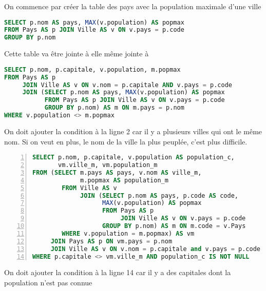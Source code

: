 \begin{Answer}
On commence par créer la table des pays avec la population maximale d'une ville
\begin{lstlisting}[language=SQL]
SELECT p.nom AS pays, MAX(v.population) AS popmax
FROM Pays AS p JOIN Ville AS v ON v.pays = p.code
GROUP BY p.nom
\end{lstlisting}

Cette table va être jointe à  elle même jointe à 
\begin{lstlisting}[language=SQL]
SELECT p.nom, p.capitale, v.population, m.popmax
FROM Pays AS p 
     JOIN Ville AS v ON v.nom = p.capitale AND v.pays = p.code
     JOIN (SELECT p.nom AS pays, MAX(v.population) AS popmax
           FROM Pays AS p JOIN Ville AS v ON v.pays = p.code
           GROUP BY p.nom) AS m ON m.pays = p.nom
WHERE v.population <> m.popmax
\end{lstlisting}
On doit ajouter la condition  à la ligne 2 car il y a plusieurs villes qui ont le même nom.
\newpage
Si on veut en plus, le nom de la ville la plus peuplée, c'est plus difficile.
\begin{lstlisting}[language=SQL,numbers=left]
SELECT p.nom, p.capitale, v.population AS population_c, 
       vm.ville_m, vm.population_m
FROM (SELECT m.pays AS pays, v.nom AS ville_m, 
             m.popmax AS population_m
        FROM Ville AS v 
             JOIN (SELECT p.nom AS pays, p.code AS code, 
                   MAX(v.population) AS popmax
                   FROM Pays AS p 
                        JOIN Ville AS v ON v.pays = p.code
                   GROUP BY p.nom) AS m ON m.code = v.Pays
        WHERE v.population = m.popmax) AS vm
     JOIN Pays AS p ON vm.pays = p.nom
     JOIN Ville AS v ON v.nom = p.capitale and v.pays = p.code
WHERE p.capitale <> vm.ville_m AND population_c IS NOT NULL
\end{lstlisting}
On doit ajouter la condition  à la ligne 14 car il y a des capitales dont la population n'est pas connue
\end{Answer}
